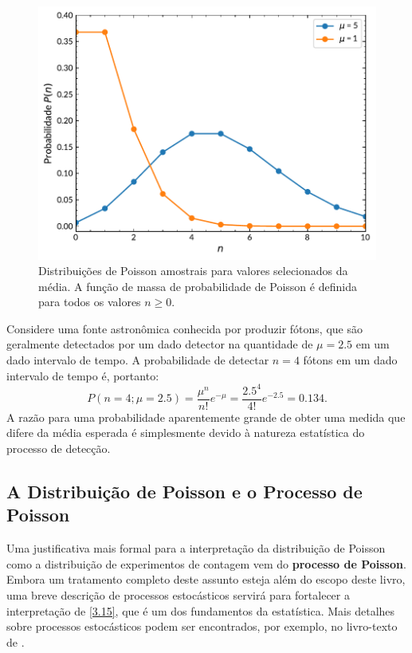 \begin{figure}
	\centering
	\includegraphics[width=0.7\linewidth]{Figuras/3-3.pdf}
	\caption{Distribuições de Poisson amostrais para valores selecionados da média. A função de massa de probabilidade de Poisson é definida para todos os valores $n \geq 0$.}
	\label{fig:3-3}
\end{figure}

\begin{exemplo}{}{}
Considere uma fonte astronômica conhecida por produzir fótons, que são geralmente detectados por um dado detector na quantidade de $\mu = 2.5$ em um dado intervalo de tempo. A probabilidade de detectar $n = 4$ fótons em um dado intervalo de tempo é, portanto:
\begin{equation*}
P(n = 4; \mu = 2.5) =  \dfrac{\mu^n}{n!}e^{- \mu} = \frac{2.5^4}{4!}e^{-2.5} = 0.134.
\end{equation*}
A razão para uma probabilidade aparentemente grande de obter uma medida que difere da média esperada é simplesmente devido à natureza estatística do processo de detecção.
\end{exemplo}

\subsection{A Distribuição de Poisson e o Processo de Poisson}

Uma justificativa mais formal para a interpretação da distribuição de Poisson como a distribuição de experimentos de contagem vem do \textbf{processo de Poisson}. Embora um tratamento completo deste assunto esteja além do escopo deste livro, uma breve descrição de processos estocásticos servirá para fortalecer a interpretação de \ref{3.15}, que é um dos fundamentos da estatística. Mais detalhes sobre processos estocásticos podem ser encontrados, por exemplo, no livro-texto de \citet{ross2019introduction}.


